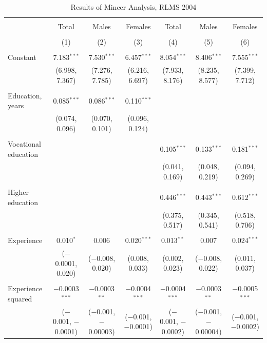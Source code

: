 \documentclass[alpha-refs]{wiley-article-01g}
\begin{document}
\begin{landscape}

\fontsize{9}{11}
\selectfont

\begin{table}[!htbp] \centering 
\renewcommand{\arraystretch}{1.0}
  \caption{Results of Mincer Analysis, RLMS 2004} 
  \label{} 
\begin{tabular}{@{\extracolsep{5pt}}lcccccc} 
\\[-1.8ex]\hline 
\hline \\[-1.8ex] 
 & Total & Males & Females & Total & Males & Females \\ 
\\[-1.8ex] & (1) & (2) & (3) & (4) & (5) & (6)\\ 
\hline \\[-1.8ex] 
 Constant & 7.183$^{***}$ & 7.530$^{***}$ & 6.457$^{***}$ & 8.054$^{***}$ & 8.406$^{***}$ & 7.555$^{***}$ \\ 
  & (6.998, 7.367) & (7.276, 7.785) & (6.216, 6.697) & (7.933, 8.176) & (8.235, 8.577) & (7.399, 7.712) \\ 
  & & & & & & \\ 
 Education, years & 0.085$^{***}$ & 0.086$^{***}$ & 0.110$^{***}$ &  &  &  \\ 
  & (0.074, 0.096) & (0.070, 0.101) & (0.096, 0.124) &  &  &  \\ 
  & & & & & & \\ 
 Vocational education &  &  &  & 0.105$^{***}$ & 0.133$^{***}$ & 0.181$^{***}$ \\ 
  &  &  &  & (0.041, 0.169) & (0.048, 0.219) & (0.094, 0.269) \\ 
  & & & & & & \\ 
 Higher education &  &  &  & 0.446$^{***}$ & 0.443$^{***}$ & 0.612$^{***}$ \\ 
  &  &  &  & (0.375, 0.517) & (0.345, 0.541) & (0.518, 0.706) \\ 
  & & & & & & \\ 
 Experience & 0.010$^{*}$ & 0.006 & 0.020$^{***}$ & 0.013$^{**}$ & 0.007 & 0.024$^{***}$ \\ 
  & ($-$0.0001, 0.020) & ($-$0.008, 0.020) & (0.008, 0.033) & (0.002, 0.023) & ($-$0.008, 0.022) & (0.011, 0.037) \\ 
  & & & & & & \\ 
 Experience squared & $-$0.0003$^{***}$ & $-$0.0003$^{**}$ & $-$0.0004$^{***}$ & $-$0.0004$^{***}$ & $-$0.0003$^{**}$ & $-$0.0005$^{***}$ \\ 
  & ($-$0.001, $-$0.0001) & ($-$0.001, $-$0.00003) & ($-$0.001, $-$0.0001) & ($-$0.001, $-$0.0002) & ($-$0.001, $-$0.00004) & ($-$0.001, $-$0.0002) \\ 

\end{tabular}
\end{table}
\end{landscape}
\end{document}
